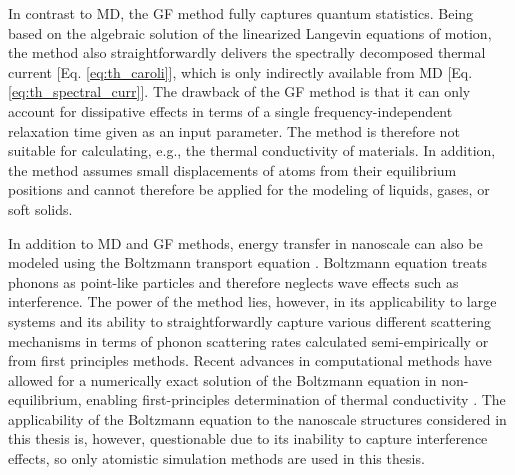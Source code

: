 In contrast to MD, the GF method fully captures quantum statistics. Being based on the algebraic solution of the linearized Langevin equations of motion, the method also straightforwardly delivers the spectrally decomposed thermal current [Eq. \eqref{eq:th_caroli}], which is only indirectly available from MD [Eq. \eqref{eq:th_spectral_curr}]. The drawback of the GF method is that it can only account for dissipative effects in terms of a single frequency-independent relaxation time given as an input parameter. The method is therefore not suitable for calculating, e.g., the thermal conductivity of materials. In addition, the method assumes small displacements of atoms from their equilibrium positions and cannot therefore be applied for the modeling of liquids, gases, or soft solids.

In addition to MD and GF methods, energy transfer in nanoscale can also be modeled using the Boltzmann transport equation \cite{ziman}. Boltzmann equation treats phonons as point-like particles and therefore neglects wave effects such as interference. The power of the method lies, however, in its applicability to large systems and its ability to straightforwardly capture various different scattering mechanisms in terms of phonon scattering rates calculated semi-empirically or from first principles methods. Recent advances in computational methods have allowed for a numerically exact solution of the Boltzmann equation in non-equilibrium, enabling first-principles determination of thermal conductivity \cite{broido07,ward09,lindsay13}. The applicability of the Boltzmann equation to the nanoscale structures considered in this thesis is, however, questionable due to its inability to capture interference effects, so only atomistic simulation methods are used in this thesis.
